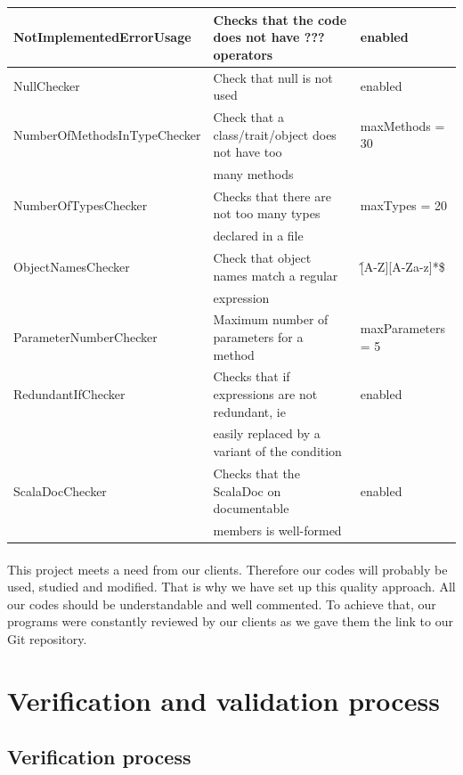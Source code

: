 \documentclass{report}
\begin{document}
\begin{center}
\begin{longtable}{|l|l|l|}
\small{NotImplementedErrorUsage} & \small{Checks that the code does not have ??? operators} & enabled \\
\hline
NullChecker & \small{Check that null is not used} & enabled \\
\hline
\small{NumberOfMethodsInTypeChecker} & \small{Check that a class/trait/object does not have too} & maxMethods = 30 \\
& \small{many methods} & \\
\hline
NumberOfTypesChecker & \small{Checks that there are not too many types} & maxTypes = 20 \\
& \small{declared in a file} & \\
\hline
ObjectNamesChecker & \small{Check that object names match a regular}  & \^[A-Z][A-Za-z]*\$ \\
& \small{expression} & \\
\hline
ParameterNumberChecker & \small{Maximum number of parameters for a method} & maxParameters = 5 \\
\hline
RedundantIfChecker & \small{Checks that if expressions are not redundant, ie} & enabled \\
& \small{easily replaced by a variant of the condition} &  \\
\hline
ScalaDocChecker & \small{Checks that the ScalaDoc on documentable}  & enabled \\
& \small{members is well-formed} & \\
\hline
\end{longtable} 
\end{center}
\paragraph{}
\hspace{4mm}\textnormal{This project meets a need from our clients. 
Therefore our codes will probably be used, studied and modified. 
That is why we have set up this quality approach. 
All our codes should be understandable and well commented. 
To achieve that, our programs were constantly reviewed by our clients
as we gave them the link to our Git repository.}

\section{Verification and validation process}

\subsection{Verification process}
\end{document}
